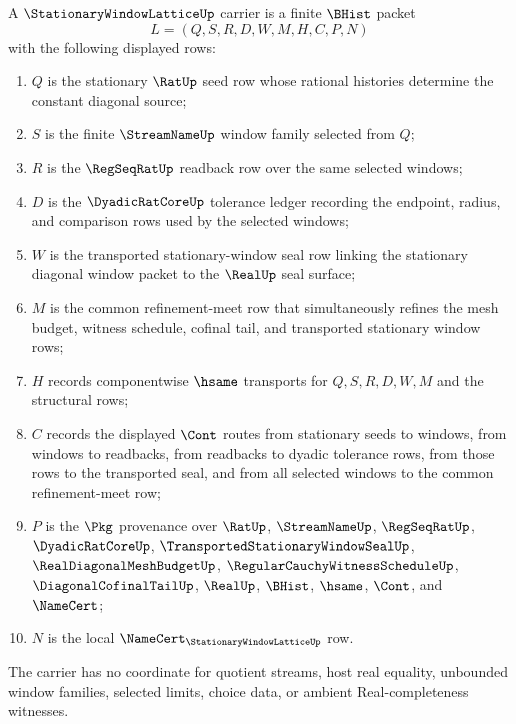 \begin{definition}
\label{def:stationary-window-lattice-carrier}
A $\StationaryWindowLatticeUp$ carrier is a finite $\BHist$ packet
$$
L=(Q,S,R,D,W,M,H,C,P,N)
$$
with the following displayed rows:
\begin{enumerate}
\item $Q$ is the stationary $\RatUp$ seed row whose rational histories determine the constant diagonal source;
\item $S$ is the finite $\StreamNameUp$ window family selected from $Q$;
\item $R$ is the $\RegSeqRatUp$ readback row over the same selected windows;
\item $D$ is the $\DyadicRatCoreUp$ tolerance ledger recording the endpoint, radius, and comparison rows used by the selected windows;
\item $W$ is the transported stationary-window seal row linking the stationary diagonal window packet to the $\RealUp$ seal surface;
\item $M$ is the common refinement-meet row that simultaneously refines the mesh budget, witness schedule, cofinal tail, and transported stationary window rows;
\item $H$ records componentwise $\hsame$ transports for $Q,S,R,D,W,M$ and the structural rows;
\item $C$ records the displayed $\Cont$ routes from stationary seeds to windows, from windows to readbacks, from readbacks to dyadic tolerance rows, from those rows to the transported seal, and from all selected windows to the common refinement-meet row;
\item $P$ is the $\Pkg$ provenance over $\RatUp$, $\StreamNameUp$, $\RegSeqRatUp$, $\DyadicRatCoreUp$, $\TransportedStationaryWindowSealUp$, $\RealDiagonalMeshBudgetUp$, $\RegularCauchyWitnessScheduleUp$, $\DiagonalCofinalTailUp$, $\RealUp$, $\BHist$, $\hsame$, $\Cont$, and $\NameCert$;
\item $N$ is the local $\NameCert_{\StationaryWindowLatticeUp}$ row.
\end{enumerate}
The carrier has no coordinate for quotient streams, host real equality, unbounded window families, selected limits, choice data, or ambient Real-completeness witnesses.
\end{definition}

